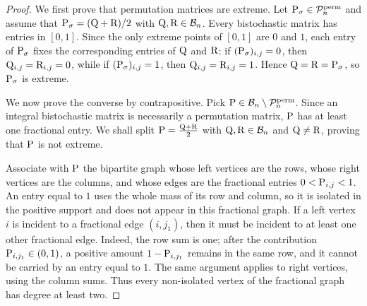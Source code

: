 \begin{proof}
	We first prove that permutation matrices are extreme. Let $\P_\sigma\in\mathcal P_n^{\mathrm{perm}}$ and assume that $\P_\sigma=(\Q+\R)/2$ with $\Q,\R\in\mathcal B_n$.
	Every bistochastic matrix has entries in $[0,1]$. Since the only extreme points of $[0,1]$ are $0$ and $1$, each entry of $\P_\sigma$ fixes the corresponding entries of $\Q$ and $\R$: if $(\P_\sigma)_{i,j}=0$, then $\Q_{i,j}=\R_{i,j}=0$, while if $(\P_\sigma)_{i,j}=1$, then $\Q_{i,j}=\R_{i,j}=1$. Hence $\Q=\R=\P_\sigma$, so $\P_\sigma$ is extreme.

	We now prove the converse by contrapositive. Pick $\P\in\mathcal B_n\setminus\mathcal P_n^{\mathrm{perm}}$. Since an integral bistochastic matrix is necessarily a permutation matrix, $\P$ has at least one fractional entry. We shall split
	\(\P=\frac{\Q+\R}{2}\)
	with $\Q,\R\in\mathcal B_n$ and $\Q\neq \R$, proving that $\P$ is not extreme.

	Associate with $\P$ the bipartite graph whose left vertices are the rows, whose right vertices are the columns, and whose edges are the fractional entries
	\(0<\P_{i,j}<1\).
	An entry equal to $1$ uses the whole mass of its row and column, so it is isolated in the positive support and does not appear in this fractional graph. If a left vertex $i$ is incident to a fractional edge $(i,j_1)$, then it must be incident to at least one other fractional edge. Indeed, the row sum is one; after the contribution $\P_{i,j_1}\in(0,1)$, a positive amount $1-\P_{i,j_1}$ remains in the same row, and it cannot be carried by an entry equal to $1$. The same argument applies to right vertices, using the column sums. Thus every non-isolated vertex of the fractional graph has degree at least two.


\end{proof}
